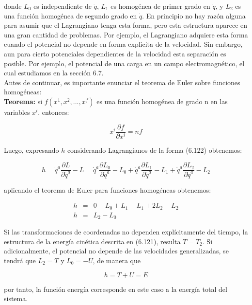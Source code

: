 \documentclass[12pt]{report}
\begin{document}
donde $L_0$ es independiente de $\dot{q}$, $L_1$ es homogénea de primer grado en $\dot{q}$, y $L_2$ es una función homogénea de segundo grado en $\dot{q}$. En principio no hay razón alguna para asumir que el Lagrangiano tenga esta forma, pero esta estructura aparece en una gran cantidad de problemas. Por ejemplo, el Lagrangiano adquiere esta forma cuando el potencial no depende en forma explicita de la velocidad. Sin embargo, aun para cierto potenciales dependientes de la velocidad esta separación es posible. Por ejemplo, el potencial de una carga en un campo electromagnético, el cual estudiamos en la sección $6.7$. \\

Antes de continuar, es importante enunciar el teorema de Euler sobre funciones homogéneas:
\\

\textbf{Teorema:} si $f(x^1,x^2,...,x^f)$ es una función homogénea de grado n en las variables $x^i$, entonces:

\begin{equation}
x^i \frac{\partial f}{\partial x^i} = nf
\end{equation} 

Luego, expresando $h$ considerando Lagrangianos de la forma (6.122) obtenemos:

\begin{equation}
h= \dot{q}^a \frac{\partial L}{\partial \dot{q}^a} - L = \dot{q}^a \frac{\partial L_0}{\partial \dot{q}^a} - L_0 + \dot{q}^a \frac{\partial L_1}{\partial \dot{q}^a} - L_1 + \dot{q}^a \frac{\partial L_2}{\partial \dot{q}^a} - L_2
\end{equation} 

aplicando el teorema de Euler para funciones homogéneas obtenemos:

\begin{eqnarray}
h&=&0-L_0+L_1-L_1+2L_2-L_2 \\
h&=&L_2-L_0
\end{eqnarray}

Si las transformaciones de coordenadas no dependen explícitamente del tiempo, la estructura de la energía cinética descrita en (6.121), resulta $T=T_2$. Si adicionalmente, el potencial no depende de las velocidades generalizadas, se tendrá que $L_2=T$ y $L_0=-U$, de manera que 

\begin{equation}
h=T+U=E
\end{equation}

por tanto, la función energía corresponde en este caso a la energía total del sistema. \\
\end{document}
